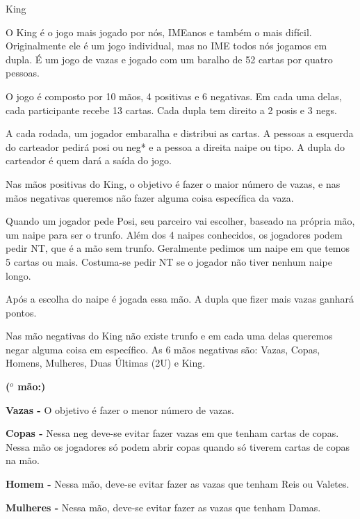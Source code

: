 \begin{subsecao}{King}

O King é o jogo mais jogado por nós, IMEanos e também o mais difícil.
Originalmente ele é um jogo individual, mas no IME todos nós jogamos em
dupla. É um jogo de vazas e jogado com um baralho de 52 cartas por quatro
pessoas.

O jogo é composto por 10 mãos, 4 positivas e 6 negativas. Em cada uma delas,
cada participante recebe 13 cartas. Cada dupla tem direito a 2 posis e 3 negs.

A cada rodada, um jogador embaralha e distribui as cartas. A pessoas a esquerda
do carteador pedirá posi ou neg* e a pessoa a direita naipe ou tipo. A dupla do
carteador é quem dará a saída do jogo.

Nas mãos positivas do King, o objetivo é fazer o maior número de vazas, e nas
mãos negativas queremos não fazer alguma coisa específica da vaza.

Quando um jogador pede Posi, seu parceiro vai escolher, baseado na própria mão,
um naipe para ser o trunfo. Além dos 4 naipes conhecidos,  os jogadores podem
pedir NT, que é a mão sem trunfo. Geralmente pedimos um naipe em que temos 5
cartas ou mais. Costuma-se pedir NT se o jogador não tiver nenhum naipe longo.

Após a escolha do naipe é jogada essa mão. A dupla que fizer mais vazas ganhará
pontos.

Nas mão negativas do King não existe trunfo e em cada uma delas queremos negar
alguma coisa em específico. As 6 mãos negativas são: Vazas, Copas, Homens,
Mulheres, Duas Últimas (2U) e King.

\begin{list}{\textbf{ ($^{o}$ mão:)}}{}

\item \textbf{Vazas -} O objetivo é fazer o menor número de vazas.

\item \textbf{Copas -}  Nessa neg deve-se evitar fazer vazas em que tenham
cartas de copas. Nessa mão os jogadores só podem abrir copas quando só tiverem
cartas de copas na mão.

\item \textbf{Homem -} Nessa mão, deve-se evitar fazer as vazas que tenham Reis
ou Valetes.

\item \textbf{Mulheres -} Nessa mão, deve-se evitar fazer as vazas que tenham
Damas.


\end{list}
\end{subsecao}
